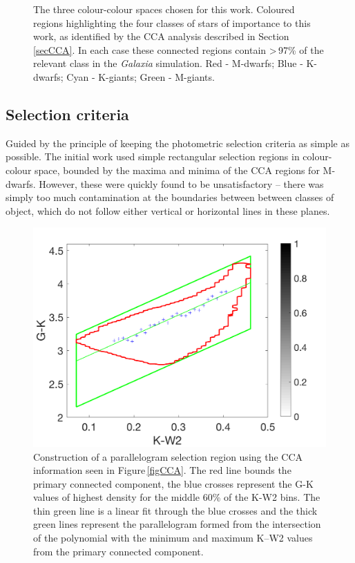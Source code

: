 \begin{figure}
    \caption{The three colour-colour spaces chosen for this work. Coloured regions highlighting the four classes of stars of importance to this work, as identified by the CCA analysis described in Section\,\ref{secCCA}. In each case these connected regions contain \textgreater\,97\% of the relevant class in the {\em Galaxia} simulation. Red - M-dwarfs; Blue - K-dwarfs; Cyan - K-giants; Green - M-giants.}
    \label{figCCP}
\end{figure}
\subsection{Selection criteria}
Guided by the principle of keeping the photometric selection criteria as simple as possible. The initial work used simple rectangular selection regions in colour-colour space, bounded by the maxima and minima of the CCA regions for M-dwarfs. However, these were quickly found to be unsatisfactory -- there was simply too much contamination at the boundaries between between classes of object, which do not follow either vertical or horizontal lines in these planes.\\

\begin{figure}
	\centering
    \includegraphics[width=1\textwidth]{Parallelogram.pdf}
    \caption{Construction of a parallelogram selection region using the CCA information seen in Figure\,\ref{figCCA}. The red line bounds the primary connected component, the blue crosses represent the G-K values of highest density for the middle 60\% of the K-W2 bins. The thin green line is a linear fit through the blue crosses and the thick green lines represent the parallelogram formed from the intersection of the polynomial with the minimum and maximum K--W2 values from the primary connected component.}
    \label{figPara}
\end{figure}

